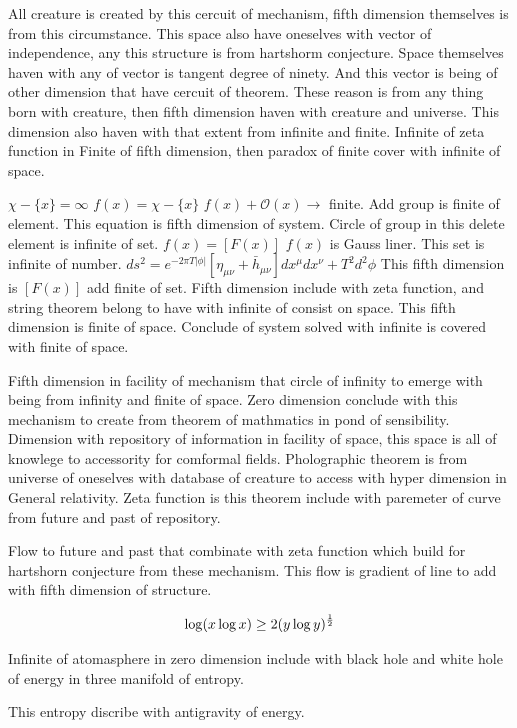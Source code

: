 \documentclass{jsarticle}
\begin{document}
  All creature is created by this cercuit of mechanism, fifth dimension themselves is from this circumstance.
This space also have oneselves with vector of independence, any this structure is from hartshorm conjecture.
Space themselves haven with any of vector is tangent degree of ninety.
And this vector is being of other dimension that have cercuit of theorem.
These reason is from any thing born with creature, then fifth dimension haven with creature and universe.
This dimension also haven with that extent from infinite and finite.
Infinite of zeta function in Finite of fifth dimension, then paradox of finite cover with infinite of space.




$ \chi - \{x\} = \infty $  $f(x) = \chi - \{x\} $ $ f(x) + \mathcal{O}(x) \to $ finite.
Add group is finite of element. This equation is fifth dimension of system.
Circle of group in this delete element  is infinite of set.
$ f(x) = [F(x)] $ $ f(x) $ is Gauss liner. This set is infinite of number.
$ ds^2 = e^{-2 \pi T |\phi|}[\eta_{\mu\nu} + \bar{h}_{\mu\nu}]dx^{\mu}dx^{\nu} + T^2 d^2 \phi $
This fifth dimension is $ [F(x)] $ add finite of set.
Fifth dimension include with zeta function, and string theorem belong to have with infinite of consist on space.
This fifth dimension is finite of space. Conclude of system solved with infinite is covered with finite of space.

   Fifth dimension in facility of mechanism that circle of infinity to emerge with being from infinity and 
finite of space. Zero dimension conclude with this mechanism to create from theorem of mathmatics in pond
of sensibility. Dimension with repository of information in facility of space, this space is all of knowlege
to accessority for comformal fields. Pholographic theorem is from universe of oneselves with database of 
creature to access with hyper dimension in General relativity. Zeta function is this theorem include with 
paremeter of curve from future and past of repository.


  Flow to future and past that combinate with zeta function which build for hartshorn conjecture from these mechanism.
This flow is gradient of line to add with fifth dimension of structure.

$$ \log(x \log x) \ge 2(y \log y)^{1 \over 2} $$


  Infinite of atomasphere in zero dimension include with black hole and white hole of energy in three manifold
of entropy.

This entropy discribe with antigravity of energy.
\end{document}
